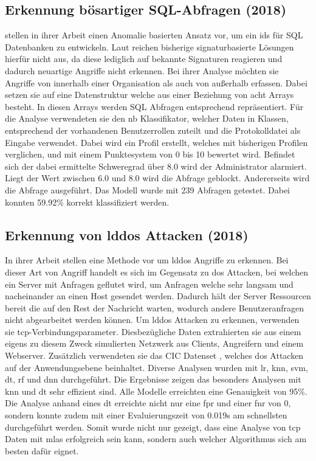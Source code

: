 \documentclass[
    12pt, %
    DIV10,
    ngerman, %
    a4paper, %
    oneside, %
    titlepage, %
    parskip=half, %
    headings=normal, %
    listof=totoc, %
    bibliography=totoc, %
    index=totoc, %
    captions=tableheading, %
    final %
]{scrreprt}
\begin{document}
\subsection{Erkennung bösartiger SQL-Abfragen (2018)}
\textcite{Jayaprakash2018} stellen in ihrer Arbeit einen Anomalie basierten Ansatz vor, um ein \ac{ids} für SQL Datenbanken zu entwickeln. Laut \textcite{Jayaprakash2018} reichen bisherige signaturbasierte Lösungen hierfür nicht aus, da diese lediglich auf bekannte Signaturen reagieren und dadurch neuartige Angriffe nicht erkennen. Bei ihrer Analyse möchten sie Angriffe von innerhalb einer Organisation als auch von außerhalb erfassen. Dabei setzen sie auf eine Datenstruktur welche aus einer Beziehung von acht Arrays besteht. In diesen Arrays werden SQL Abfragen entsprechend repräsentiert. Für die Analyse verwendeten sie den \acl{nb} Klassifikator, welcher Daten in Klassen, entsprechend der vorhandenen Benutzerrollen zuteilt und die Protokolldatei als Eingabe verwendet. Dabei wird ein Profil erstellt, welches mit bisherigen Profilen verglichen, und mit einem Punktesystem von 0 bis 10 bewertet wird. Befindet sich der dabei ermittelte Schweregrad über 8.0 wird der Administrator alarmiert. Liegt der Wert zwischen 6.0 und 8.0 wird die Abfrage geblockt. Andererseits wird die Abfrage ausgeführt. Das Modell wurde mit 239 Abfragen getestet. Dabei konnten 59.92\% korrekt klassifiziert werden.
%
\subsection{Erkennung von \ac{lddos} Attacken (2018)}
In ihrer Arbeit stellen \textcite{siracusano2018detection} eine Methode vor um \ac{lddos} Angriffe zu erkennen. Bei dieser Art von Angriff handelt es sich im Gegensatz zu \ac{dos} Attacken, bei welchen ein Server mit Anfragen geflutet wird, um Anfragen welche sehr langsam und nacheinander an einen Host gesendet werden. Dadurch hält der Server Ressourcen bereit die auf den Rest der Nachricht warten, wodurch andere Benutzeranfragen nicht abgearbeitet werden können. Um \ac{lddos} Attacken zu erkennen, verwenden sie \ac{tcp}-Verbindungsparameter. Diesbezügliche Daten extrahierten sie aus einem eigens zu diesem Zweck simulierten Netzwerk aus Clients, Angreifern und einem Webserver. Zusätzlich verwendeten sie das CIC Datenset \parencite{jazi2017detecting}, welches \ac{dos} Attacken auf der Anwendungsebene beinhaltet.
Diverse Analysen wurden mit \ac{lr}, \ac{knn}, \ac{svm}, \ac{dt}, \ac{rf} und \ac{dnn} durchgeführt. Die Ergebnisse zeigen das besonders Analysen mit \ac{knn} und \ac{dt} sehr effizient sind. Alle Modelle erreichten eine Genauigkeit von 95\%. Die Analyse anhand eines \acl{dt} erreichte nicht nur eine \ac{fpr} und einer \ac{fnr} von 0, sondern konnte zudem mit einer Evaluierungszeit von 0.019s am schnellsten durchgeführt werden. Somit wurde nicht nur gezeigt, dass eine Analyse von \ac{tcp} Daten mit \ac{mlas} erfolgreich sein kann, sondern auch welcher Algorithmus sich am besten dafür eignet.
%
\end{document}
